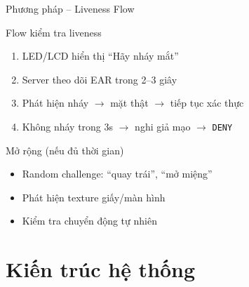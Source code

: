 \documentclass[aspectratio=169]{beamer}
\begin{document}
\begin{frame}{Phương pháp -- Liveness Flow}
  \begin{block}{Flow kiểm tra liveness}
    \begin{enumerate}
      \item LED/LCD hiển thị ``Hãy nháy mắt''
      \item Server theo dõi EAR trong 2--3 giây
      \item Phát hiện nháy $\to$ mặt thật $\to$ tiếp tục xác thực
      \item Không nháy trong 3s $\to$ nghi giả mạo $\to$ \texttt{DENY}
    \end{enumerate}
  \end{block}

  \vspace{0.6em}
  \begin{block}{Mở rộng (nếu đủ thời gian)}
    \begin{itemize}
      \item Random challenge: ``quay trái'', ``mở miệng''
      \item Phát hiện texture giấy/màn hình
      \item Kiểm tra chuyển động tự nhiên
    \end{itemize}
  \end{block}
\end{frame}

\section{Kiến trúc hệ thống}
\end{document}
